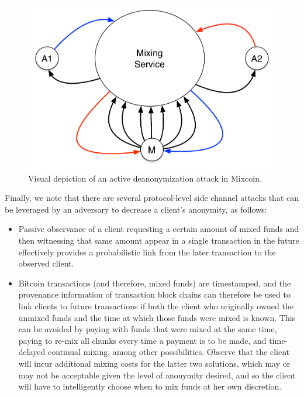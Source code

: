 \begin{figure}
\begin{center}
\includegraphics[scale=0.45]{images/mixcoin_deanon.pdf}
\caption{Visual depiction of an active deanonymization attack in Mixcoin.}
\label{fig:mix-design}
\end{center}
\end{figure}

Finally, we note that there are several protocol-level side channel attacks that can be leveraged by an adversary to decrease a client's anonymity, as follows:
\begin{itemize}
	\item Passive observance of a client requesting a certain amount of mixed funds and then witnessing that same amount appear in a single transaction in the future effectively provides a probabilistic link from the later transaction to the observed client.
	\item Bitcoin transactions (and therefore, mixed funds) are timestamped, and the provenance information of transaction block chains can therefore be used to link clients to future transactions if both the client who originally owned the unmixed funds and the time at which those funds were mixed is known. This can be avoided by paying with funds that were mixed at the same time, paying to re-mix all chunks every time a payment is to be made, and time-delayed continual mixing, among other possibilities. Observe that the client will incur additional mixing costs for the latter two solutions, which may or may not be acceptable given the level of anonymity desired, and so the client will have to intelligently choose when to mix funds at her own discretion.
\end{itemize}

